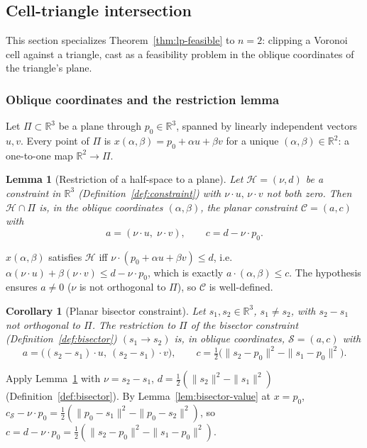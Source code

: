 \documentclass[12pt]{article}
\makeatletter
\newtheorem{lemma}[theorem]{Lemma}
\newtheorem{corollary}[theorem]{Corollary}
\theoremstyle{definition}
\theoremstyle{remark}
\renewenvironment{proof}[1][\proofname]{\par
  \pushQED{\qed}%
  \normalfont \footnotesize \topsep6\p@\@plus6\p@\relax
  \list{}{\leftmargin=2em
          \settowidth{\itemindent}{\itshape#1}%
          \labelwidth=\itemindent
          \parsep=0pt \listparindent=\parindent 
  }
  \item[\hskip\labelsep
        \itshape
    #1\@addpunct{.}]\ignorespaces
}{%
  \popQED\endlist\@endpefalse
}
\makeatother
\begin{document}
\subsection{Cell-triangle intersection}\label{sec:lp-plane}

This section specializes Theorem~\ref{thm:lp-feasible} to $n=2$: clipping a
Voronoi cell against a triangle, cast as a feasibility problem in the oblique
coordinates of the triangle's plane.

\subsubsection*{Oblique coordinates and the restriction lemma}

Let $\Pi \subset \mathbb{R}^3$ be a plane through $p_0 \in \mathbb{R}^3$,
spanned by linearly independent vectors $u,v$. Every point of $\Pi$ is
$x(\alpha,\beta) = p_0 + \alpha u + \beta v$ for a unique $(\alpha,\beta) \in
\mathbb{R}^2$: a one-to-one map $\mathbb{R}^2 \to \Pi$.

\begin{lemma}[Restriction of a half-space to a plane]\label{lem:restrict}
Let $\mathcal{H} = (\nu, d)$ be a constraint in $\mathbb{R}^3$
(Definition~\ref{def:constraint}) with $\nu \cdot u,\, \nu \cdot v$ not both
zero. Then $\mathcal H \cap \Pi$ is, in the oblique coordinates
$(\alpha,\beta)$, the planar constraint $\mathcal C = (a,c)$ with
\begin{equation*}
    a = (\nu\cdot u,\; \nu \cdot v), \qquad c = d - \nu\cdot p_0.
\end{equation*}
\end{lemma}
\begin{proof}
$x(\alpha,\beta)$ satisfies $\mathcal H$ iff $\nu \cdot (p_0 + \alpha u +
\beta v) \le d$, i.e.\ $\alpha(\nu\cdot u) + \beta(\nu\cdot v) \le d - \nu\cdot
p_0$, which is exactly $a\cdot(\alpha,\beta)\le c$. The hypothesis ensures
$a\neq0$ ($\nu$ is not orthogonal to $\Pi$), so $\mathcal C$ is well-defined.
\end{proof}

\begin{corollary}[Planar bisector constraint]\label{cor:planar-bisector}
Let $s_1,s_2 \in \mathbb{R}^3$, $s_1\neq s_2$, with $s_2-s_1$ not orthogonal
to $\Pi$. The restriction to $\Pi$ of the bisector constraint
(Definition~\ref{def:bisector}) $(s_1\!\to\!s_2)$ is, in oblique
coordinates, $\mathcal S = (a,c)$ with
\begin{equation*}
    a = \big((s_2-s_1)\cdot u,\ (s_2-s_1)\cdot v\big), \qquad
    c = \tfrac12\big(\|s_2-p_0\|^2-\|s_1-p_0\|^2\big).
\end{equation*}
\end{corollary}
\begin{proof}
Apply Lemma~\ref{lem:restrict} with $\nu=s_2-s_1$, $d=\tfrac12(\|s_2\|^2-\|s_1\|^2)$
(Definition~\ref{def:bisector}). By Lemma~\ref{lem:bisector-value} at
$x=p_0$, $c_{\mathcal S} - \nu\cdot p_0 = \tfrac12(\|p_0-s_1\|^2-\|p_0-s_2\|^2)$,
so $c = d-\nu\cdot p_0 = \tfrac12(\|s_2-p_0\|^2-\|s_1-p_0\|^2)$.
\end{proof}
\end{document}
